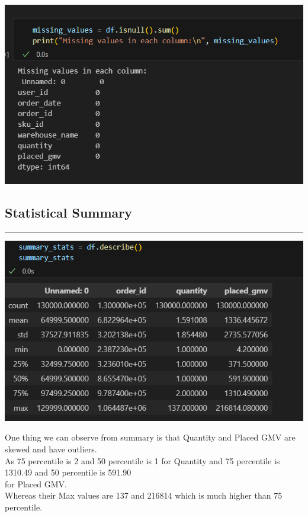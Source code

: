 \documentclass{article}
\renewcommand{\answer}[1]{
  \begin{tcolorbox}[
    breakable,
    enhanced,
    colback=backgroundColor,
    colframe=primaryColor,
    coltitle=white,
    title=Answer
  ]
    #1
  \end{tcolorbox}
}
\begin{document}
\begin{itemize}
{\begin{center}
                \includegraphics[width=1\columnwidth]{images/missing_values.png}
            \end{center}
        }
    \end{itemize}
    
    \subsection{Statistical Summary}
    \begin{center}
        \color{green}\rule{1\linewidth}{0.7mm}
    \end{center}
    \begin{center}
        \includegraphics[width=1\columnwidth]{images/data-summary.png}
    \end{center}
    \answer{
       One thing we can observe from summary is that Quantity and Placed GMV are skewed and have outliers.\\
       As 75 percentile is 2 and 50 percentile is 1 for Quantity and 75 percentile is 1310.49 and 50 percentile is 591.90\\
        for Placed GMV.\\
       Whereas their Max values are 137 and 216814 which is much higher than 75 percentile.\\
    }
    
\end{document}
